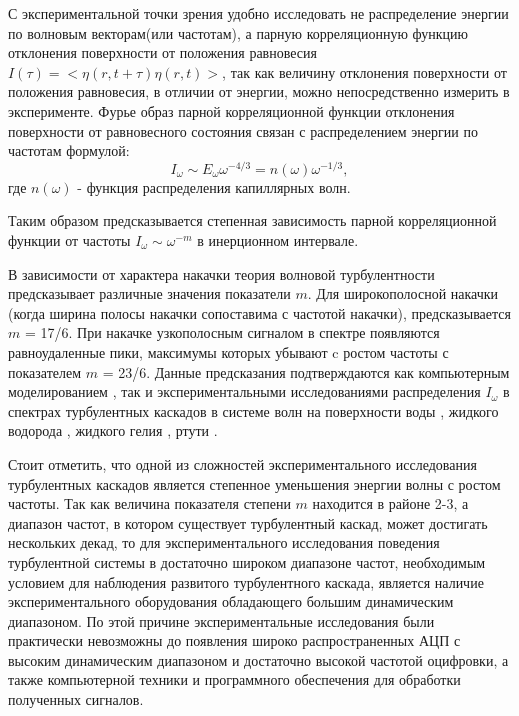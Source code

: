 С экспериментальной точки зрения удобно исследовать не распределение энергии по волновым векторам(или частотам), а парную корреляционную функцию отклонения поверхности от положения равновесия $I(\tau)=<\eta(r, t+\tau)\eta(r,t)>$, так как величину отклонения поверхности от положения равновесия, в отличии от энергии, можно непосредственно измерить в эксперименте. Фурье образ парной корреляционной функции отклонения поверхности от равновесного состояния связан с распределением энергии по частотам формулой:
\begin{equation}
\label{eq:EOmegaI}
I_\omega \sim E_\omega \omega^{-4/3} = n(\omega) \omega^{-1/3},
\end{equation}
где $n(\omega)$ - функция распределения капиллярных волн.

Таким образом предсказывается степенная зависимость парной корреляционной функции от частоты $I_\omega \sim \omega^{-m}$ в инерционном интервале.

В зависимости от характера накачки теория волновой турбулентности предсказывает различные значения показатели $m$. Для широкополосной накачки (когда ширина полосы накачки сопоставима с  частотой накачки), предсказывается $m$ = 17/6. При накачке узкополосным сигналом в спектре появляются равноудаленные пики, максимумы которых убывают c ростом частоты с показателем $m$ = 23/6. Данные предсказания подтверждаются как компьютерным моделированием \cite{Babiano1995, Babiano1987, Falcovich1988, Pushkarev1996}, так и экспериментальными исследованиями распределения $I_\omega$
в спектрах турбулентных каскадов в системе волн на поверхности воды \cite{BrazhnikovWater}, жидкого водорода \cite{Brazhnikov2001}, жидкого гелия \cite{Abdurakhimov2007}, ртути \cite{Falcon2007}.

Стоит отметить, что одной из сложностей экспериментального исследования турбулентных каскадов является степенное уменьшения энергии волны с ростом частоты. Так как величина показателя степени $m$ находится в районе 2-3, а диапазон частот, в котором существует турбулентный каскад, может достигать нескольких декад, то для экспериментального исследования поведения турбулентной системы в достаточно широком диапазоне частот, необходимым условием для наблюдения развитого турбулентного каскада, является наличие экспериментального оборудования обладающего большим динамическим диапазоном. По этой причине экспериментальные исследования были практически невозможны до появления широко распространенных АЦП с высоким динамическим диапазоном и достаточно высокой частотой оцифровки, а также компьютерной техники и программного обеспечения для обработки полученных сигналов.

